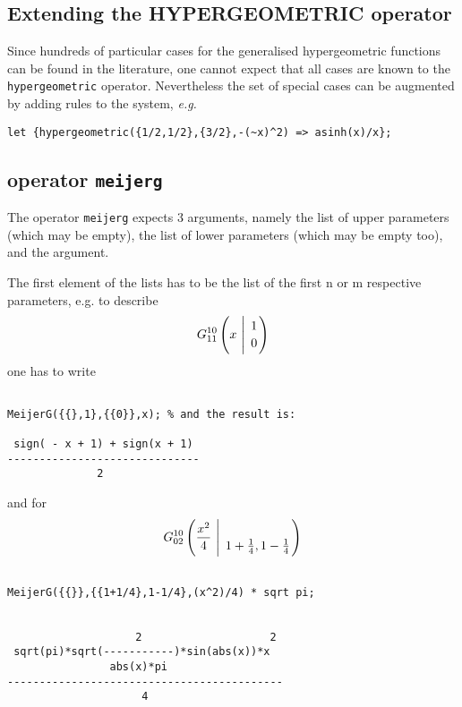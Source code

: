 \subsection{Extending the HYPERGEOMETRIC operator}

Since hundreds of particular cases for the generalised hypergeometric
functions can be found in the literature, one cannot expect that all
cases are known to the \texttt{hypergeometric} operator.
Nevertheless the set of special cases can be augmented by adding
rules to the \REDUCE{} system, {\em e.g.}
\begin{verbatim}
let {hypergeometric({1/2,1/2},{3/2},-(~x)^2) => asinh(x)/x};
\end{verbatim}


\subsection{\REDUCE{} operator {\tt meijerg}}
\hypertarget{operator:MEIJERG}{}

The operator \texttt{meijerg} expects 3 arguments, namely the 
list of upper parameters (which may be empty), the list of lower
parameters (which may be empty too), and the argument.

The first element of the lists has to be the list of the
first n or m respective parameters, e.g. to describe 
\begin{displaymath}
G_{1 1}^{1 0} \left( x \  \Bigg\vert \  \genfrac{}{}{0pt}{}{1}{0} \right)
\end{displaymath}
one has to write 
\begin{verbatim}

MeijerG({{},1},{{0}},x); % and the result is:

 sign( - x + 1) + sign(x + 1)
------------------------------
              2

\end{verbatim}
and for
\begin{displaymath}
G_{0 2}^{1 0} \left( \frac{x^2}{4} \  \Bigg\vert \ \genfrac{}{}{0pt}{}{}{{1+ \frac{1}{4} },
{1-\frac{1}{4}}} \right)
\end{displaymath}
\begin{verbatim}

MeijerG({{}},{{1+1/4},1-1/4},(x^2)/4) * sqrt pi;


                    2                    2
 sqrt(pi)*sqrt(-----------)*sin(abs(x))*x
                abs(x)*pi
-------------------------------------------
                     4


\end{verbatim}

